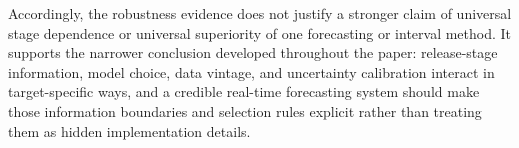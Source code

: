 Accordingly, the robustness evidence does not justify a stronger claim of
universal stage dependence or universal superiority of one forecasting or
interval method. It supports the narrower conclusion developed throughout
the paper: release-stage information, model choice, data vintage, and
uncertainty calibration interact in target-specific ways, and a credible
real-time forecasting system should make those information boundaries and
selection rules explicit rather than treating them as hidden implementation
details.

